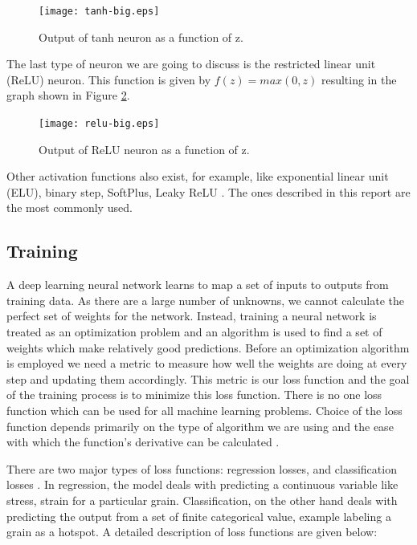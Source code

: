 \begin{figure}[!h]
	\centering
	\texttt{[image: tanh-big.eps]}
	\hspace{1mm}
	\caption{Output of tanh neuron as a function of z.} 
	\label{fig:tanh}
\end{figure}

The last type of neuron we are going to discuss is the restricted linear unit (ReLU) neuron. This function is given by $f(z) = max(0,z)$ resulting in the graph shown in Figure \ref{fig:relu}.

\begin{figure}[!h]
	\centering
	\texttt{[image: relu-big.eps]}
	\hspace{1mm}
	\caption{Output of ReLU neuron as a function of z.} 
	\label{fig:relu}
\end{figure}

Other activation functions also exist, for example, like exponential linear unit (ELU), binary step, SoftPlus, Leaky ReLU \cite{karlik2011performance}. The ones described in this report are the most commonly used.

\subsection{Training}
A deep learning neural network learns to map a set of inputs to outputs from training data. As there are a large number of unknowns, we cannot calculate the perfect set of weights for the network. Instead, training a neural network is treated as an optimization problem and an algorithm is used to find a set of weights which make relatively good predictions. Before an optimization algorithm is employed we need a metric to measure how well the weights are doing at every step and updating them accordingly. This metric is our loss function and the goal of the training process is to minimize this loss function. There is no one loss function which can be used for all machine learning problems. Choice of the loss function depends primarily on the type of algorithm we are using and the ease with which the function's derivative can be calculated \cite{whytrain}. 

There are two major types of loss functions: regression losses, and classification losses \cite{losses}. In regression, the model deals with predicting a continuous variable like stress, strain for a particular grain. Classification, on the other hand deals with predicting the output from a set of finite categorical value, example labeling a grain as a hotspot. A detailed description of loss functions are given below:

